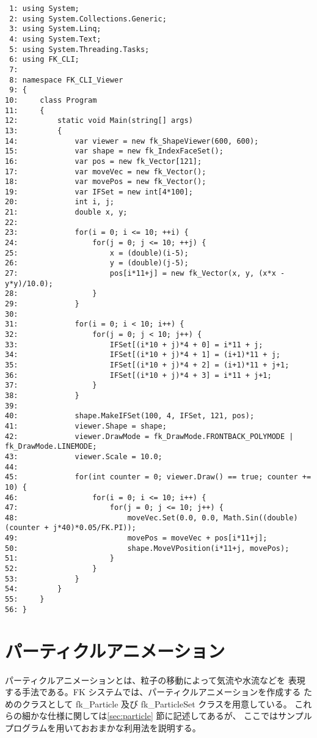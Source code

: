 \begin{breakbox}
\begin{small}
\begin{verbatim}
 1: using System;
 2: using System.Collections.Generic;
 3: using System.Linq;
 4: using System.Text;
 5: using System.Threading.Tasks;
 6: using FK_CLI;
 7: 
 8: namespace FK_CLI_Viewer
 9: {
10:     class Program
11:     {
12:         static void Main(string[] args)
13:         {
14:             var viewer = new fk_ShapeViewer(600, 600);
15:             var shape = new fk_IndexFaceSet();
16:             var pos = new fk_Vector[121];
17:             var moveVec = new fk_Vector();
18:             var movePos = new fk_Vector();
19:             var IFSet = new int[4*100];
20:             int i, j;
21:             double x, y;
22: 
23:             for(i = 0; i <= 10; ++i) {
24:                 for(j = 0; j <= 10; ++j) {
25:                     x = (double)(i-5);
26:                     y = (double)(j-5);
27:                     pos[i*11+j] = new fk_Vector(x, y, (x*x - y*y)/10.0);
28:                 }
29:             }
30: 
31:             for(i = 0; i < 10; i++) {
32:                 for(j = 0; j < 10; j++) {
33:                     IFSet[(i*10 + j)*4 + 0] = i*11 + j;
34:                     IFSet[(i*10 + j)*4 + 1] = (i+1)*11 + j;
35:                     IFSet[(i*10 + j)*4 + 2] = (i+1)*11 + j+1;
36:                     IFSet[(i*10 + j)*4 + 3] = i*11 + j+1;
37:                 }
38:             }
39: 
40:             shape.MakeIFSet(100, 4, IFSet, 121, pos);
41:             viewer.Shape = shape;
42:             viewer.DrawMode = fk_DrawMode.FRONTBACK_POLYMODE | fk_DrawMode.LINEMODE;
43:             viewer.Scale = 10.0;
44: 
45:             for(int counter = 0; viewer.Draw() == true; counter += 10) {
46:                 for(i = 0; i <= 10; i++) {
47:                     for(j = 0; j <= 10; j++) {
48:                         moveVec.Set(0.0, 0.0, Math.Sin((double)(counter + j*40)*0.05/FK.PI));
49:                         movePos = moveVec + pos[i*11+j];
50:                         shape.MoveVPosition(i*11+j, movePos);
51:                     }
52:                 }
53:             }
54:         }
55:     }
56: }
\end{verbatim}
\end{small}
\end{breakbox}

\section{パーティクルアニメーション}
パーティクルアニメーションとは、粒子の移動によって気流や水流などを
表現する手法である。FK システムでは、パーティクルアニメーションを作成する
ためのクラスとして fk\_Particle 及び fk\_ParticleSet クラスを用意している。
これらの細かな仕様に関しては\ref{sec:particle} 節に記述してあるが、
ここではサンプルプログラムを用いておおまかな利用法を説明する。

